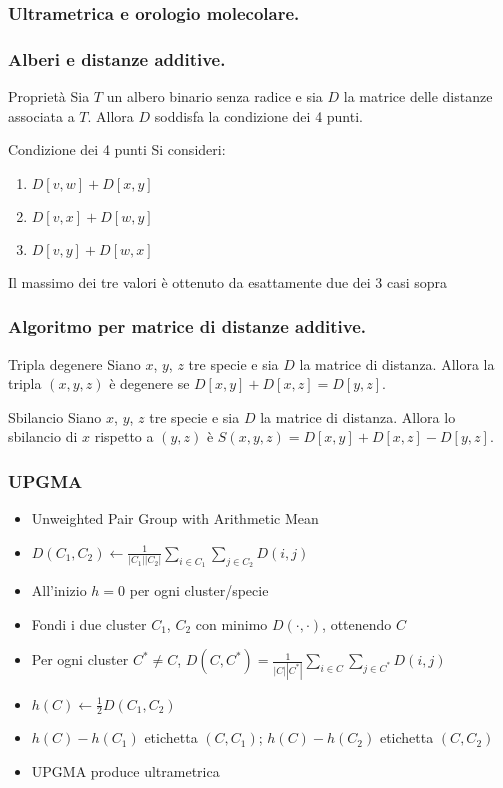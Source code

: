 \begin{frame}[fragile]
\frametitle{Ultrametrica e orologio molecolare.}
\end{frame}

\begin{frame}[fragile]
\frametitle{Alberi e distanze additive.}
\begin{block}{Proprietà}
Sia $T$ un albero binario senza radice e sia $D$ la matrice delle distanze associata a $T$.
Allora $D$ soddisfa la condizione dei 4 punti.
\end{block}
\begin{block}{Condizione dei 4 punti}
Si consideri:
\begin{enumerate}
\item
$D[v,w] + D[x,y]$
\item
$D[v,x] + D[w,y]$
\item
$D[v,y] + D[w,x]$
\end{enumerate}
Il massimo dei tre valori è ottenuto da esattamente due dei 3 casi sopra
\end{block}
\end{frame}

\begin{frame}[fragile]
\frametitle{Algoritmo per matrice di distanze additive.}
\begin{block}{Tripla degenere}
Siano $x$, $y$, $z$ tre specie e sia $D$ la matrice di distanza.
Allora la tripla $(x,y,z)$ è \alert{degenere} se $D[x,y] + D[x,z] = D[y,z]$.
\end{block}

\begin{block}{Sbilancio}
Siano $x$, $y$, $z$ tre specie e sia $D$ la matrice di distanza.
Allora lo sbilancio di $x$ rispetto a $(y,z)$ è $S(x, y, z) = D[x,y] + D[x,z] - D[y,z]$.
\end{block}
\end{frame}

\begin{frame}[fragile]
  \frametitle{UPGMA}
\begin{itemize}
\item
  Unweighted Pair Group with Arithmetic Mean
\item
  $D(C_{1}, C_{2}) \gets \frac{1}{|C_{1}||C_{2}|}\sum_{i\in C_{1}}\sum_{j\in C_{2}} D(i,j)$
\item
  All'inizio $h=0$ per ogni cluster/specie
\item
Fondi i due cluster $C_{1}$, $C_{2}$ con minimo $D(\cdot, \cdot)$, ottenendo $C$
\item
  Per ogni cluster $C^{*}\neq C$, $D(C, C^{*}) = \frac{1}{|C||C^{*}|}\sum_{i\in C}\sum_{j\in C^{*}} D(i,j)$
\item
  $h(C)\gets \frac{1}{2}D(C_{1}, C_{2})$
\item
  $h(C) - h(C_{1})$ etichetta $(C, C_{1})$; $h(C) - h(C_{2})$ etichetta $(C, C_{2})$
\item
  UPGMA produce ultrametrica
\end{itemize}
\end{frame}

